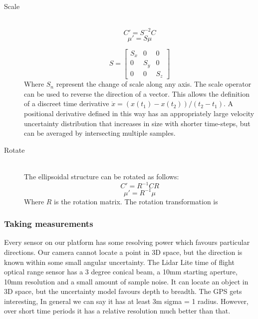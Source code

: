 \documentclass[a4paper, 11pt, titlepage]{article}
\begin{document}
\begin{description}
      \item[Scale] \hfill \\
      \begin{equation}
      C' = S^{-2} C
      \end{equation}
      \begin{equation}
      \mu' = S \mu
      \end{equation}

      \begin{equation}
      S=\begin{bmatrix}
        S_x & 0 & 0 \\[0.3em]
        0 & S_y & 0 \\[0.3em]
        0 & 0 & S_z
      \end{bmatrix}
      \end{equation}
      Where \(S_n\) represent the change of scale along any axis.
      The scale operator can be used to reverse the direction of a vector.  This allows the definition of a discreet time derivative \(\dot{x} = (x(t_1) - x(t_2))/(t_2-t_1)\).  A positional derivative defined in this way has an appropriately large velocity uncertainty distribution that increases in size with shorter time-steps, but can be averaged by intersecting multiple samples.

      \item[Rotate] \hfill \\
      The ellipsoidal structure can be rotated as follows:
      \begin{equation}
      C' = R^{-1} C R
      \end{equation}
      \begin{equation}
      \mu' = R^{-1} \mu
      \end{equation}
      Where \(R\) is the rotation matrix.
      The rotation transformation is 

    \end{description}
    \subsubsection{Taking measurements}
      Every sensor on our platform has some resolving power which favours particular directions.
      Our camera cannot locate a point in 3D space, but the direction is known within some small angular uncertainty.
      The Lidar Lite time of flight optical range sensor has a 3 degree conical beam, a 10mm starting aperture, 10mm resolution and a small amount of sample noise. It can locate an object in 3D space, but the uncertainty model favours depth to breadth.
      The GPS gets interesting, In general we can say it has at least 3m sigma = 1 radius. However, over short time periods it has a relative resolution much better than that.
\end{document}
